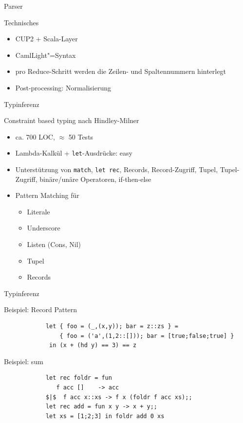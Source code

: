 \documentclass[hyperref={pdfpagelabels=false}]{beamer}
\begin{document}
\begin{frame}{Parser}
  \begin{block}{Technisches}
    \begin{itemize}
      \item CUP2 + Scala-Layer
      \item CamlLight"=Syntax
      \item pro Reduce-Schritt werden die Zeilen- und Spaltennummern hinterlegt
      \item Post-processing: Normalisierung
    \end{itemize}
  \end{block}
\end{frame}

\begin{frame}{Typinferenz}
  \begin{block}{Constraint based typing nach Hindley-Milner}
    \begin{itemize}
      \item ca. 700 LOC, $\approx$ 50 Tests
      \item Lambda-Kalkül + \texttt{let}-Ausdrücke: easy \smiley
      \item Unterstützung von \texttt{match}, \texttt{let rec}, Records, Record-Zugriff, Tupel, Tupel-Zugriff, binäre/unäre Operatoren, if-then-else
      \item Pattern Matching für 
        \begin{itemize}
	  \item Literale
	  \item Underscore
	  \item Listen (Cons, Nil)
	  \item Tupel
	  \item Records
        \end{itemize}
    \end{itemize}
  \end{block}
\end{frame}

\begin{frame}[fragile]{Typinferenz}
  \begin{block}{Beispiel: Record Pattern}
      \begin{verbatim}
            let { foo = (_,(x,y)); bar = z::zs } =
                { foo = ('a',(1,2::[])); bar = [true;false;true] }
             in (x + (hd y) == 3) == z
      \end{verbatim}
  \end{block}
  \begin{block}{Beispiel: sum}
      \begin{verbatim}
            let rec foldr = fun
               f acc []    -> acc
            $|$  f acc x::xs -> f x (foldr f acc xs);;
            let rec add = fun x y -> x + y;;
            let xs = [1;2;3] in foldr add 0 xs
      \end{verbatim}
  \end{block}
\end{frame}
\end{document}
